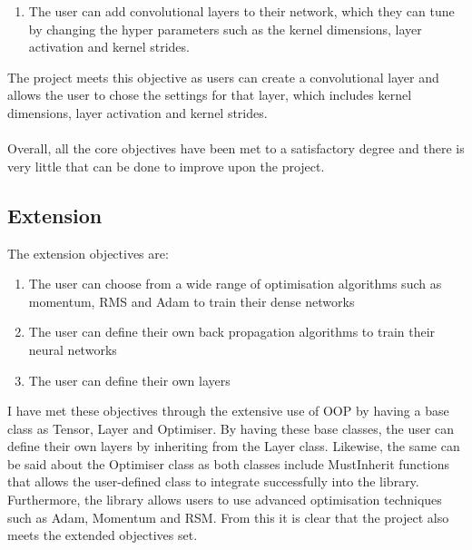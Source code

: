 \begin{enumerate}
    \addtocounter{enumi}{10}
    \item The user can add convolutional layers to their network, which they can tune by changing the hyper parameters such as the kernel dimensions, layer activation and kernel strides. 
\end{enumerate}

The project meets this objective as users can create a convolutional layer and allows the user to chose the settings for that layer, which includes kernel dimensions, layer activation and kernel strides. 
\\ \\
Overall, all the core objectives have been met to a satisfactory degree and there is very little that can be done to improve upon the project.

\subsection{Extension}
The extension objectives are: 
\begin{enumerate}
    \item The user can choose from a wide range of optimisation algorithms such as momentum, RMS and Adam to train their dense networks
    \item The user can define their own back propagation algorithms to train their neural networks
    \item The user can define their own layers
\end{enumerate}

I have met these objectives through the extensive use of OOP by having a base class as Tensor, Layer and Optimiser. By having these base classes, the user can define their own layers by inheriting from the Layer class. Likewise, the same can be said about the Optimiser class as both classes include MustInherit functions that allows the user-defined class to integrate successfully into the library. Furthermore, the library allows users to use advanced optimisation techniques such as Adam, Momentum and RSM. From this it is clear that the project also meets the extended objectives set.